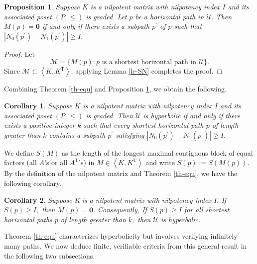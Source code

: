 \documentclass[reqno]{amsart}
\theoremstyle{plain}
\newtheorem{corollary}{Corollary}
\newtheorem{proposition}{Proposition}
\numberwithin{equation}{section}
\begin{document}
\begin{proposition}
\label{prop-Sp}Suppose $K$ is a nilpotent matrix with nilpotency index $I$
and its associated poset $(P,\leq )$ is graded. Let $p$ be a horizontal path
in $\mathcal{U}.$ Then $M(p)=\boldsymbol{0}$ if and only if there exists a
subpath $p^{\prime }$ of $p$ such that $\left\vert N_{0}(p^{\prime
})-N_{1}(p^{\prime })\right\vert \geq I.$
\end{proposition}

\begin{proof}
Let 
\begin{equation*}
\mathcal{M}=\{M(p):p\text{ is a shortest horizontal path in }\mathcal{U}\}.
\end{equation*}%
Since $\mathcal{M}\subset \left\langle K,K^{\mathrm{T}}\right\rangle $,
applying Lemma \ref{le-SN} completes the proof.
\end{proof}

Combining Theorem \ref{th-equ} and Proposition \ref{prop-Sp}, we obtain the
following.

\begin{corollary}
Suppose $K$ is a nilpotent matrix with nilpotency index $I$ and its
associated poset $(P,\leq )$ is graded. Then $\mathcal{U}$ is hyperbolic if
and only if there exists a positive integer $k$ such that every shortest
horizontal path $p$ of length greater than $k$ contains a subpath $p^{\prime
} $ satisfying $\left\vert N_{0}(p^{\prime })-N_{1}(p^{\prime })\right\vert
\geq I$.
\end{corollary}

We define $S(M)$ as the length of the longest maximal contiguous block of
equal factors (all $A$'s or all $A^{\mathrm{T}}$'s) in $M\in \left\langle
K,K^{\mathrm{T}}\right\rangle $ and write $S(p):=S(M(p))$. By the definition
of the nilpotent matrix and Theorem \ref{th-equ}, we have the following
corollary.

\begin{corollary}
\label{coro-N0-N1}Suppose $K\ $is a nilpotent matrix with nilpotency index $%
I $. If $S(p)\geq I,$ then $M(p)=\boldsymbol{0}.$ Consequently, If $S(p)\geq
I$ for all shortest horizontal paths $p$ of length greater than $k,$ then $%
\mathcal{U}$ is hyperbolic.
\end{corollary}

Theorem \ref{th-equ} characterizes hyperbolicity but involves verifying
infinitely many paths. We now deduce finite, verifiable criteria from this
general result in the following two subsections.
\end{document}
